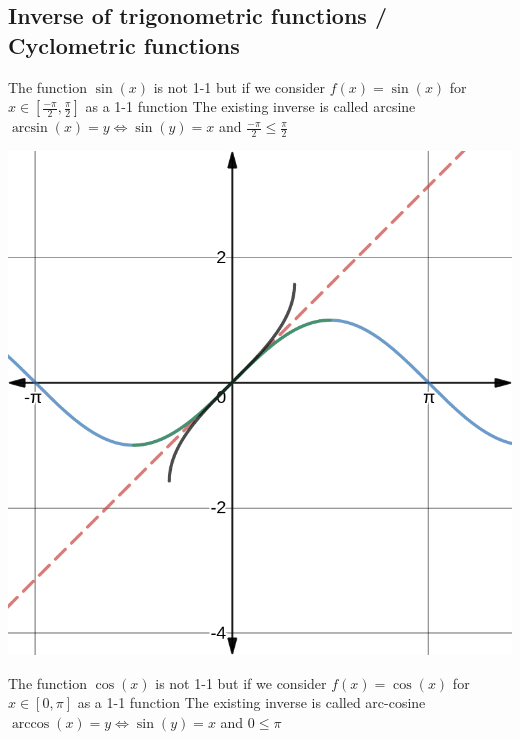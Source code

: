 \documentclass{article}
\begin{document}
	\subsection{Inverse of trigonometric functions / Cyclometric functions}
	The function $\sin(x)$ is not 1-1 but if we consider $f(x) = \sin(x)$ for $x\in [\frac{-\pi}{2}, \frac{\pi}{2}]$ as a 1-1 function The existing inverse is called arcsine $\arcsin(x)=y \Leftrightarrow \sin(y)=x$ and $\frac{-\pi}{2} \leq \frac{\pi}{2}$
	\begin{center}\includegraphics[scale=0.25]{4.png}\end{center}
	The function $\cos(x)$ is not 1-1 but if we consider $f(x) = \cos(x)$ for $x\in [0, \pi]$ as a 1-1 function The existing inverse is called arc-cosine $\arccos(x)=y \Leftrightarrow \sin(y)=x$ and $0 \leq \pi$ 
\end{document}
